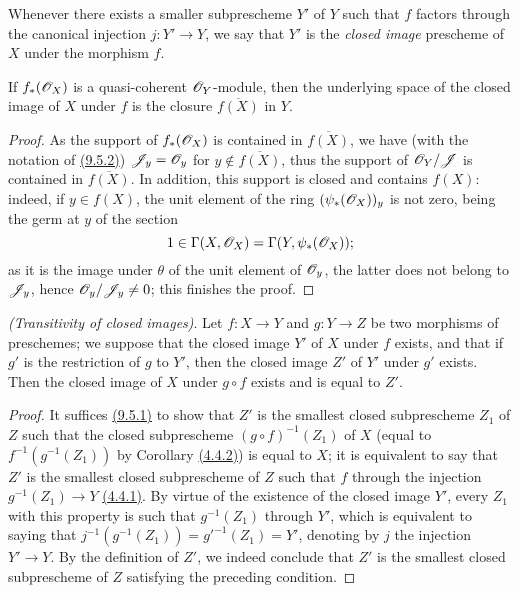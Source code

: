 \begin{defn}[9.5.3]
\label{defn-1.9.5.3}
Whenever there exists a smaller subprescheme $Y'$ of $Y$ such that $f$ factors
through the canonical injection $j:Y'\to Y$, we say that $Y'$ is the
{\em closed image} prescheme of $X$ under the morphism $f$.
\end{defn}

\begin{prop}[9.5.4]
\label{prop-1.9.5.4}
If $f_*(\mathscr{O}_X)$ is a quasi-coherent $\mathscr{O}_Y$-module, then the underlying space of
the closed image of $X$ under $f$ is the closure $\overline{f(X)}$ in $Y$.
\end{prop}

\begin{proof}
\label{proof-prop-1.9.5.4}
As the support of $f_*(\mathscr{O}_X)$ is contained in $\overline{f(X)}$, we have (with
the notation of \hyperref[cor-1.9.5.2]{(9.5.2)}) $\mathscr{J}_y=\mathscr{O}_y$ for
$y\not\in\overline{f(X)}$, thus the support of $\mathscr{O}_Y/\mathscr{J}$ is contained in
$\overline{f(X)}$. In addition, this support is closed and contains $f(X)$:
indeed, if $y\in f(X)$, the unit element of the ring $(\psi_*(\mathscr{O}_X))_y$ is not
zero, being the germ at $y$ of the section
\[
  1\in\Gamma(X,\mathscr{O}_X)=\Gamma(Y,\psi_*(\mathscr{O}_X));
\]
as it is the image under $\theta$ of the unit element of $\mathscr{O}_y$, the latter
does not belong to $\mathscr{J}_y$, hence $\mathscr{O}_y/\mathscr{J}_y\neq 0$; this finishes the
proof.
\end{proof}

\begin{prop}[9.5.5]
\label{prop-1.9.5.5}
{\em (Transitivity of closed images)}. Let $f:X\to Y$ and $g:Y\to Z$ be two morphisms of
preschemes; we suppose that the closed image $Y'$ of $X$ under $f$ exists, and that if $g'$
is the restriction of $g$ to $Y'$, then the closed image $Z'$ of $Y'$ under $g'$ exists. Then
the closed image of $X$ under $g\circ f$ exists and is equal to $Z'$.
\end{prop}

\begin{proof}
\label{proof-prop-1.9.5.5}
It suffices \hyperref[prop-1.9.5.1]{(9.5.1)} to show that $Z'$ is the smallest closed
subprescheme $Z_1$ of $Z$ such that the closed subprescheme $(g\circ f)^{-1}(Z_1)$ of $X$
(equal to $f^{-1}(g^{-1}(Z_1))$ by Corollary \hyperref[cor-1.4.4.2]{(4.4.2)}) is equal to
$X$; it is equivalent to say that $Z'$ is the smallest closed subprescheme of $Z$ such that
$f$  through the injection $g^{-1}(Z_1)\to Y$ \hyperref[prop-1.4.4.1]{(4.4.1)}. By
virtue of the existence of the closed image $Y'$, every $Z_1$ with this property is such
that $g^{-1}(Z_1)$  through $Y'$, which is equivalent to saying that $j^{-1}(g^{-1}(Z_1))=g'^{-1}(Z_1)=Y'$, denoting by $j$ the injection $Y'\to Y$.
By the definition of $Z'$, we indeed conclude that $Z'$ is the smallest closed
subprescheme of $Z$ satisfying the preceding condition.
\end{proof}


